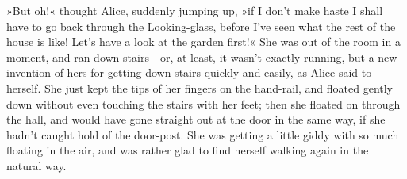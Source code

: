 »But oh!« thought Alice, suddenly jumping up, »if I don't make haste I shall have to go back through the Looking-glass, before I've seen what the rest of the house is like! Let's have a look at the garden first!« She was out of the room in a moment, and ran down stairs—or, at least, it wasn't exactly running, but a new invention of hers for getting down stairs quickly and easily, as Alice said to herself. She just kept the tips of her fingers on the hand-rail, and floated gently down without even touching the stairs with her feet; then she floated on through the hall, and would have gone straight out at the door in the same way, if she hadn't caught hold of the door-post. She was getting a little giddy with so much floating in the air, and was rather glad to find herself walking again in the natural way.